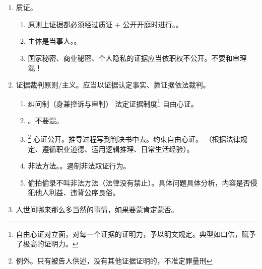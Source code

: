 \begin{enumerate}
\begin{enumerate}
                \begin{kk}{法院查明的事实与当事人主张/自认的事实不一致}
                  \begin{enumerate}
                    \item 禁止突袭裁判。剥夺了举证、质证权利。
                    \item {}。当事人（处分权），法院。
                    \item {}。
                  \end{enumerate}
                \end{kk}
        \end{enumerate}
  \item 质证。
        \begin{enumerate}
          \item 原则上证据都必须经过质证 + 公开开庭时进行。。
          \item 主体是当事人。。
          \item 国家秘密、商业秘密、个人隐私的证据应当依职权不公开。不要和审理混！
        \end{enumerate}
  \item 证据裁判原则/主义。应当以证据认定事实、靠证据依法裁判。
        \begin{enumerate}
          \item 纠问制（身兼控诉与审判） \yjt 法定证据制度\footnote{自由心证对立面，对每一个证据的证明力，予以明文规定。典型如口供，赋予了极高的证明力。} \yjt 自由心证。
          \item {}。不要混。
          \item {}
                \footnote{例外。只有被告人供述，没有其他证据证明的，不准定罪量刑}
                \yjt 心证公开。推导过程写到判决书中去。约束自由心证。
                （根据法律规定、遵循职业道德、运用逻辑推理、日常生活经验）。
          \item 非法方法。。遏制非法取证行为。
          \item 偷拍偷录不叫非法方法（法律没有禁止）。具体问题具体分析，内容是否侵犯他人利益、违背公序良俗。
        \end{enumerate}
  \item 人世间哪来那么多当然的事情，如果要蒙肯定蒙否。
\end{enumerate}
